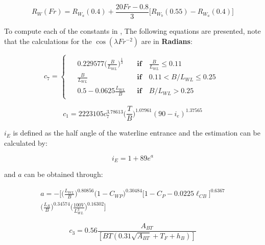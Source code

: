 \begin{equation}\label{eqn:R_w_mid}
    R_W(Fr) = R_{W_a}(0.4) + \frac{20Fr-0.8}{3} \biggl[ R_{W_b}(0.55) - R_{W_a}(0.4)\biggr]
\end{equation}

To compute each of the constants in , The following equations are presented, note that the calculations for the \textbf{$\cos (\lambda Fr^{-2})$} are in \textbf{Radians}:

\begin{equation}\label{eqn:c_7}
    c_7 = \begin{cases}
        \begin{aligned}
        &0.229577\biggl(\frac{B}{L_{WL}} \biggr)^\frac{1}{3}  &&\textbf{if} \quad \frac{B}{L_{WL}} \leqslant 0.11 \\
        &\frac{B}{L_{WL}}  &&\textbf{if}  \quad 0.11 < B/L_{WL} \leqslant 0.25\\
        &0.5 - 0.0625\frac{L_{WL}}{B}  &&\textbf{if}  \quad B/L_{WL}>0.25 
        \end{aligned} 
    \end{cases}
\end{equation}

\begin{equation}\label{eqn:c_1}
    c_1 = 2223105c_7^{3.78613}\biggl( \frac{T}{B}\biggr)^{1.07961}(90-i_e)^{1.37565}
\end{equation}

$i_E$ is defined as the half angle of the waterline entrance and the estimation can be calculated by:

\begin{equation}\label{eqn:i_e}
    i_E = 1+89 e^{a}
\end{equation}

and $a$ can be obtained through:

\begin{multline}\label{eqn:a_const_ie}
    a = -\biggl[ \biggl(\frac{L_{WL}}{B}\biggr)^{0.80856} \biggl(1 - C_{WP}\biggr)^{0.30484} \biggl[1 - C_P - 0.0225\ell_{CB}\biggr]^{0.6367} \\
    \biggl(\frac{L_R}{B}\biggr)^{0.34574} \biggl(\frac{100V}{L_{WL}^3}\biggr)^{0.16302} \biggr]
\end{multline}

\begin{equation}\label{eqn:c3}
    c_3 = 0.56 \frac{A_{BT}}{\left[BT\left(0.31 \sqrt{A_{BT}} + T_F + h_B\right)\right]}
\end{equation}

